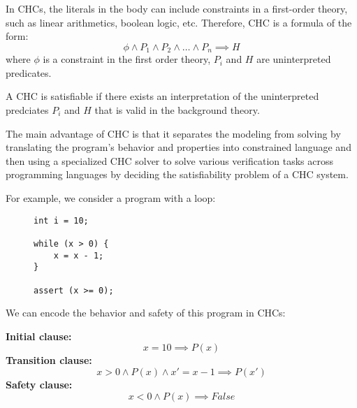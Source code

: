 \vspace{\baselineskip}
In CHCs, the literals in the body can include constraints in a first-order theory, such as linear arithmetics, boolean logic, etc.
Therefore, CHC is a formula of the form:
\begin{equation*}
    \phi \land P_{1} \land P_{2} \land \dots \land P_{n} \implies H
\end{equation*}
where $\phi$ is a constraint in the first order theory, $P_i$ and $H$ are uninterpreted predicates.

\vspace{\baselineskip}\noindent
A CHC is satisfiable if there exists an interpretation of the uninterpreted predciates $P_i$ and $H$ that is valid in the background theory.

The main advantage of CHC is that it separates the modeling
from solving by translating the program’s behavior and properties into
constrained language and then using a specialized CHC solver to solve various
verification tasks across programming languages by deciding the satisfiability
problem of a CHC system.

\vspace{\baselineskip}\noindent
For example, we consider a program with a loop:
\vspace{\baselineskip}
\begin{figure}[h]
    \begin{mdframed}
        \begin{lstlisting}
int i = 10;

while (x > 0) {
    x = x - 1;
}

assert (x >= 0);
        \end{lstlisting}
    \end{mdframed}
\end{figure}

\noindent We can encode the behavior and safety of this program in CHCs:

\noindent\vspace{\baselineskip}
\textbf{Initial clause:}
\begin{equation}
    x = 10 \implies P(x)
    \label{chc:init}
\end{equation}
\vspace{\baselineskip}
\textbf{Transition clause:}
\begin{equation}
    x > 0 \land P(x) \land x' = x - 1 \implies P(x')
    \label{chc:trans}
\end{equation}
\vspace{\baselineskip}
\textbf{Safety clause:}
\begin{equation}
    x < 0 \land P(x) \implies False
    \label{chc:safe}
\end{equation}

